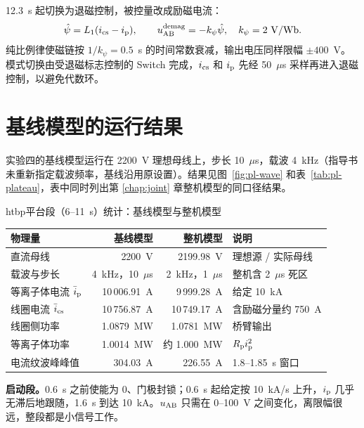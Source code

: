 12.3~s 起切换为退磁控制，被控量改成励磁电流：
\begin{equation}
\hat\psi=L_1(i\sub{cs}-i\sub{p}),\qquad u^{\mathrm{demag}}\sub{AB}=-k_\psi\hat\psi,\quad k_\psi=2\ \mathrm{V/Wb}.
\label{eq:demag}
\end{equation}
纯比例律使磁链按 $1/k_\psi=0.5$~s 的时间常数衰减，输出电压同样限幅 $\pm400$~V。模式切换由受退磁标志控制的 Switch 完成，$i_{\mathrm{cs}}$ 和 $i_{\mathrm{p}}$ 先经 50~$\mu$s 采样再进入退磁控制，以避免代数环。

\section{基线模型的运行结果}

实验四的基线模型运行在 2200~V 理想母线上，步长 10~$\mu$s，载波 4~kHz（指导书未重新指定载波频率，基线沿用原设置）。结果见图~\ref{fig:pl-wave} 和表~\ref{tab:pl-plateau}，表中同时列出第 \ref{chap:joint} 章整机模型的同口径结果。


\begin{dtable}{htbp}{平台段（6--11~s）统计：基线模型与整机模型}
\label{tab:pl-plateau}
\begin{tabularx}{\linewidth}{LRRL}
\toprule
\headrow 物理量 & 基线模型 & 整机模型 & 说明 \\
\midrule
直流母线 & 2200~V & 2199.98~V & 理想源 / 实际母线 \\
载波与步长 & 4~kHz，10~$\mu$s & 2~kHz，1~$\mu$s & 整机含 2~$\mu$s 死区 \\
等离子体电流 $\bar i_{\mathrm{p}}$ & 10\,006.91~A & 9\,999.28~A & 给定 10~kA \\
线圈电流 $\bar i_{\mathrm{cs}}$ & 10\,756.87~A & 10\,749.17~A & 含励磁分量约 750~A \\
线圈侧功率 & 1.0879~MW & 1.0781~MW & 桥臂输出 \\
等离子体功率 & 1.0014~MW & 约 1.000~MW & $R_{\mathrm{p}}i_{\mathrm{p}}^2$ \\
电流纹波峰峰值 & 304.03~A & 226.55~A & 1.8--1.85~s 窗口 \\
\bottomrule
\end{tabularx}
\end{dtable}

\textbf{启动段。}0.6~s 之前使能为 0、门极封锁；0.6~s 起给定按 10~kA/s 上升，$i_{\mathrm{p}}$ 几乎无滞后地跟随，1.6~s 到达 10~kA。$u_{\mathrm{AB}}$ 只需在 0--100~V 之间变化，离限幅很远，整段都是小信号工作。

